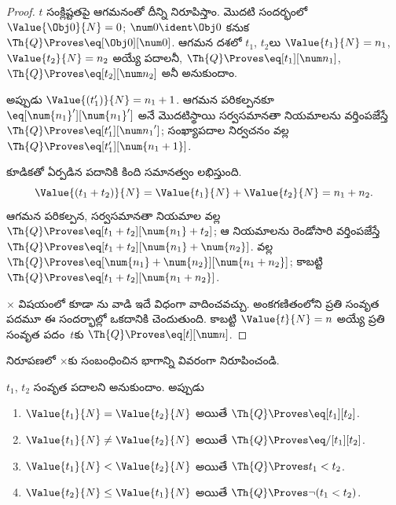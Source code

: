 \documentclass[../../../include/open-logic-section]{subfiles}
\begin{document}
\begin{proof}
$t$ సంక్లిష్టతపై ఆగమనంతో దీన్ని నిరూపిస్తాం. మొదటి సందర్భంలో
$\Value{\Obj 0}{N}=0$; $\num0\ident\Obj0$ కనుక
$\Th{Q}\Proves\eq[\Obj0][\num0]$.
%
ఆగమన దశలో $t_1$, $t_2$లు
$\Value{t_1}{N}=n_1$, $\Value{t_2}{N}=n_2$ అయ్యే పదాలనీ,
$\Th{Q}\Proves\eq[t_1][\num n_1]$, $\Th{Q}\Proves\eq[t_2][\num n_2]$
అనీ అనుకుందాం.

అప్పుడు $\Value{(t_1')}{N}=n_1+1$. ఆగమన పరికల్పనకూ
$\eq[\num{n_1}'][\num{n_1}']$ అనే  మొదటిస్థాయి సర్వసమానతా
నియమాలను వర్తింపజేస్తే $\Th{Q}\Proves\eq[t_1'][{\num n_1}']$;
సంఖ్యాపదాల నిర్వచనం వల్ల $\Th{Q}\Proves\eq[t_1'][\num{n_1+1}]$.

కూడికతో ఏర్పడిన పదానికి కింది సమానత్వం లభిస్తుంది.
\[
      \Value{(t_1 + t_2)}{N}
    = \Value{t_1}{N} + \Value{t_2}{N}
    = n_1 + n_2.
\]
ఆగమన పరికల్పన, సర్వసమానతా నియమాల వల్ల
$\Th{Q}\Proves\eq[t_1+t_2][\num{n_1}+t_2]$; ఆ నియమాలను రెండోసారి
వర్తింపజేస్తే $\Th{Q}\Proves\eq[t_1+t_2][\num{n_1}+\num{n_2}]$.
 వల్ల
$\Th{Q}\Proves\eq[\num{n_1}+\num{n_2}][\num{n_1+n_2}]$; కాబట్టి
$\Th{Q}\Proves\eq[t_1+t_2][\num{n_1+n_2}]$.

$\times$ విషయంలో కూడా ను వాడి
ఇదే విధంగా వాదించవచ్చు.
%
అంకగణితంలోని ప్రతి సంవృత పదమూ ఈ సందర్భాల్లో ఒకదానికి చెందుతుంది. కాబట్టి
$\Value{t}{N}=n$ అయ్యే ప్రతి సంవృత పదం~$t$కు
$\Th{Q}\Proves\eq[t][\num n]$.
\end{proof}

\begin{prob}
 నిరూపణలో $\times$కు సంబంధించిన భాగాన్ని
వివరంగా నిరూపించండి.
\end{prob}

\begin{lem}
$t_1$, $t_2$ సంవృత పదాలని అనుకుందాం. అప్పుడు
\begin{enumerate}
\item $\Value{t_1}{N}=\Value{t_2}{N}$ అయితే
    $\Th{Q}\Proves\eq[t_1][t_2]$.
\item $\Value{t_1}{N}\neq\Value{t_2}{N}$ అయితే
    $\Th{Q}\Proves\eq/[t_1][t_2]$.
\item $\Value{t_1}{N}<\Value{t_2}{N}$ అయితే
    $\Th{Q}\Proves t_1<t_2$.
\item $\Value{t_2}{N}\leq\Value{t_1}{N}$ అయితే
    $\Th{Q}\Proves\lnot(t_1<t_2)$.
\end{enumerate}
\end{lem}
\end{document}
